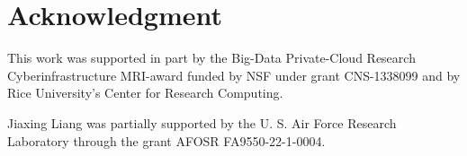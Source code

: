 \section{Acknowledgment}\label{sec:Acknowledgment}



This work was supported in part by the Big-Data Private-Cloud Research Cyberinfrastructure MRI-award funded by NSF under grant CNS-1338099 and by Rice University's Center for Research Computing.

Jiaxing Liang was partially supported by the U. S. Air Force Research Laboratory through the grant AFOSR FA9550-22-1-0004. 